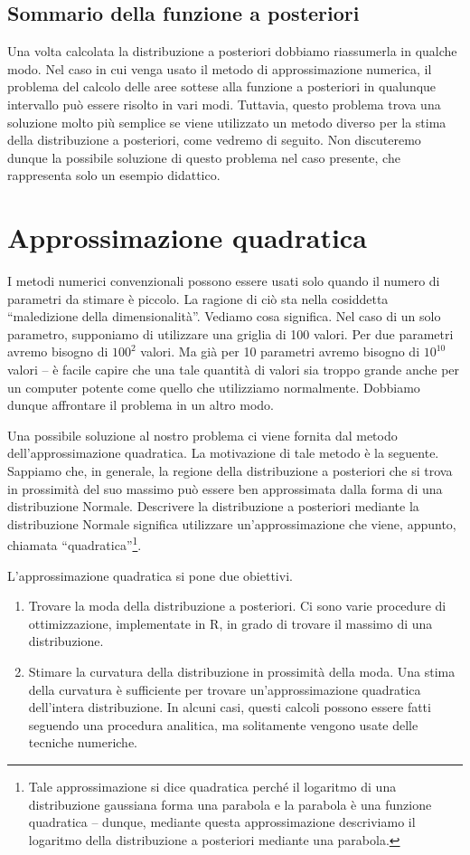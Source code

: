 \subsection{Sommario della funzione a posteriori}

Una volta calcolata la distribuzione a posteriori dobbiamo riassumerla in qualche modo.
Nel caso in cui venga usato il metodo di approssimazione numerica, il problema del calcolo delle aree sottese alla funzione a posteriori in qualunque intervallo può essere risolto in vari modi.
Tuttavia, questo problema trova una soluzione molto più semplice se viene utilizzato un  metodo diverso per la stima della distribuzione a posteriori, come vedremo di seguito.
Non discuteremo dunque la possibile soluzione di questo problema nel caso presente, che rappresenta solo un esempio didattico.


\section{Approssimazione quadratica}

I metodi numerici convenzionali possono essere usati solo quando il numero di parametri da stimare è piccolo.
La ragione di ciò sta nella cosiddetta \enquote{maledizione della dimensionalità}. 
Vediamo cosa significa.
Nel caso di un solo parametro, supponiamo di utilizzare una griglia di 100 valori.
Per due parametri avremo bisogno di $100^2$ valori.
Ma già per 10 parametri avremo bisogno di $10^{10}$ valori -- è facile capire che una tale quantità di valori sia troppo grande anche per un computer potente come quello che utilizziamo normalmente.
Dobbiamo dunque affrontare il problema in un altro modo.

Una possibile soluzione al nostro problema ci viene fornita dal metodo dell'approssimazione quadratica. 
La motivazione di tale metodo è la seguente.
Sappiamo che, in generale, la regione della distribuzione a posteriori che si trova in prossimità del suo massimo può essere ben approssimata dalla forma di una distribuzione Normale.
Descrivere la distribuzione a posteriori mediante la distribuzione Normale significa utilizzare un'approssimazione che viene, appunto, chiamata \enquote{quadratica}\footnote{Tale approssimazione si dice quadratica perché il logaritmo di una distribuzione gaussiana forma una parabola e la parabola è una funzione quadratica -- dunque, mediante questa approssimazione descriviamo il logaritmo della distribuzione a posteriori mediante una parabola.}.

L'approssimazione quadratica si pone due obiettivi.
\begin{enumerate}
\item Trovare la moda della distribuzione a posteriori.
Ci sono varie procedure di ottimizzazione, implementate in \textsf{R}, in grado di trovare il massimo di una distribuzione.
\item
Stimare la curvatura della distribuzione in prossimità della moda.
Una stima della curvatura è sufficiente per trovare un'approssimazione quadratica dell'intera distribuzione.
In alcuni casi, questi calcoli possono essere fatti seguendo una procedura analitica, ma solitamente vengono usate delle tecniche numeriche.
\end{enumerate}

